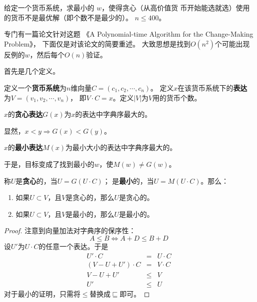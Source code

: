 \begin{prob}
	给定一个货币系统，求最小的
	$w$，使得贪心（从高价值货
	币开始能选就选）使用的货币不是最优解（即个数不是最少的）。
	$n \le 400$。
\end{prob}

\begin{sol}
	专门有一篇论文针对这题
	《A Polynomial-time Algorithm for the Change-Making Problem》，
	下面仅是对该论文的简要重述。
	大致思想是找到$O(n^2)$个可能出现反例的$w$，然后每个$O(n)$验证。\par
	首先是几个定义。
	\begin{definition}
		定义一个\textbf{货币系统}为$n$维向量$C = (c_1, c_2, \cdots, c_n)$。
		定义$x$在该货币系统下的\textbf{表达}为$V = (v_1, v_2, \cdots, v_n)$，
		即$V \cdot C = x$。定义$|V|$为$V$用的货币个数。
	\end{definition}
	
	\begin{definition}
		$x$的\textbf{贪心表达}$G(x)$为$x$的表达中字典序最大的。
	\end{definition}
	显然，$x < y \Rightarrow G(x) < G(y)$。
	
	\begin{definition}
		$x$的\textbf{最小表达}$M(x)$为最小大小的表达中字典序最大的。
	\end{definition}
	于是，目标变成了找到最小的$w$，使$M(w) \not = G(w)$。
	
	\begin{theorem}
		称$U$是\textbf{贪心}的，当$U = G(U \cdot C)$；
		是\textbf{最小}的，当$U = M(U \cdot C)$。那么：
		\begin{enumerate}
			\item 如果$U \subset V$，且$V$是贪心的，那么$U$是贪心的。
			\item 如果$U \subset V$，且$V$是最小的，那么$U$是最小的。
		\end{enumerate}
	\end{theorem}
	
	\begin{proof}
		注意到向量加法对字典序的保序性：
		\begin{displaymath}
			A \le B \Leftrightarrow A + D \le B + D
		\end{displaymath}
		设$U'$为$U \cdot C$的任意一个表达。于是
		\begin{eqnarray}
		U' \cdot C &=& U \cdot C \nonumber \\
		(V - U + U') \cdot C &=& V \cdot C \nonumber \\
		V - U + U' &\le& V \nonumber \\
		U' &\le& U \nonumber
		\end{eqnarray}
		对于最小的证明，只需将$\le$替换成$\sqsubseteq$即可。
	\end{proof}
	

\end{sol}
